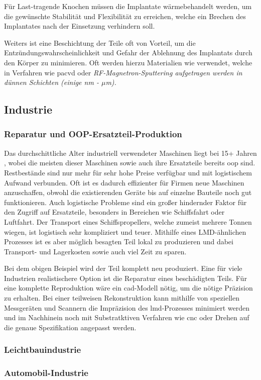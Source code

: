 \documentclass[../main.tex]{subfiles}
\begin{document}
Für Last-tragende Knochen müssen die Implantate wärmebehandelt werden, um die gewünschte Stabilität und Flexibilität zu erreichen, welche ein Brechen des Implantates nach der Einsetzung verhindern soll.

Weiters ist eine Beschichtung der Teile oft von Vorteil, um die Entzündungswahrscheinlichkeit und Gefahr der Ablehnung des Implantats durch den Körper zu minimieren. Oft werden hierzu Materialien wie  verwendet, welche in Verfahren wie \acrfull{pacvd} oder \it{RF-Magnetron-Sputtering} aufgetragen werden in dünnen Schichten (einige nm - $\mu$m).\parencite{Chudinova2016}

 
\subsection{Industrie}
\subsubsection{Reparatur und OOP-Ersatzteil-Produktion}
Das durchschittliche Alter industriell verwendeter Maschinen liegt bei 15+ Jahren \parencite{lifespan_1}, wobei die meisten dieser Maschinen sowie auch ihre Ersatzteile bereits \acrfull{oop} sind. 
Restbestände sind nur mehr für sehr hohe Preise verfügbar und mit logistischem Aufwand verbunden. 
Oft ist es dadurch effizienter für Firmen neue Maschinen anzuschaffen, obwohl die existierenden Geräte bis auf einzelne Bauteile noch gut funktionieren. 
Auch logistische Probleme sind ein großer hindernder Faktor für den Zugriff auf Ersatzteile, besonders in Bereichen wie Schiffsfahrt oder Luftfahrt. Der Transport eines Schiffspropellers, welche zumeist mehrere Tonnen wiegen, ist logistisch sehr kompliziert und teuer.  
Mithilfe eines LMD-ähnlichen Prozesses ist es aber möglich besagten Teil lokal zu produzieren \parencite{ship_1} und dabei Transport- und Lagerkosten sowie auch viel Zeit zu sparen. 

Bei dem obigen Beispiel wird der Teil komplett neu produziert. 
Eine für viele Industrien realistischere Option ist die Reparatur eines beschädigten Teils. Für eine komplette Reproduktion wäre ein \acrshort{cad}-Modell nötig, um die nötige Präzision zu erhalten. 
Bei einer teilweisen Rekonstruktion kann mithilfe von speziellen Messgeräten und Scannern die Impräzision des \acrshort{lmd}-Prozesses minimiert werden und im Nachhinein noch mit Substratktiven Verfahren wie \acrfull{cnc} oder Drehen auf die genaue Spezifikation angepasst werden. 
\subsubsection{Leichtbauindustrie}

\subsubsection{Automobil-Industrie}
\end{document}
